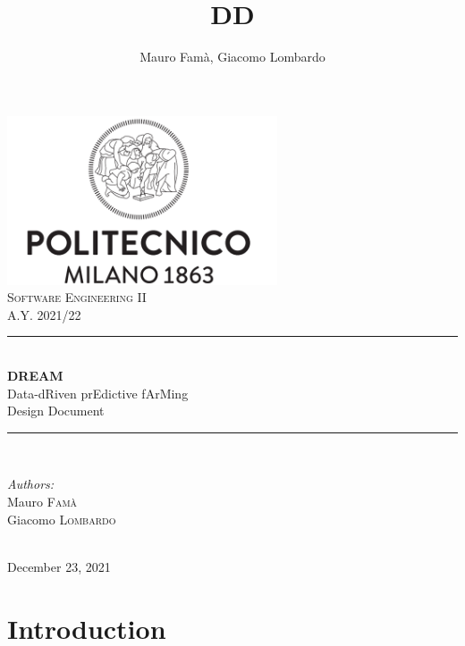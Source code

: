 \documentclass[10pt]{article}
\title{DD}
\author{Mauro Famà, Giacomo Lombardo}
\begin{document}
\thispagestyle{empty}
\begin{titlepage}
    \newcommand{\HRule}{\rule{\linewidth}{0.5mm}}
    \center
    \includegraphics[width=8cm]{polimi.png}\\[1cm]

    \textsc{\Large Software Engineering II}\\[0.5cm]
    \textsc{\large A.Y. 2021/22}\\[0.5cm]

    \HRule \\[0.4cm]
        { \Huge \bfseries DREAM}\\[0.2cm]
        { \large Data-dRiven prEdictive fArMing}\\[0.4cm]
        { \LARGE Design Document}
    \HRule \\[1.5cm]

    \begin{minipage}{0.4\textwidth}
        \begin{flushleft} \large
        \emph{Authors:}\\
        Mauro \textsc{Famà}\\
        Giacomo \textsc{Lombardo}\\
        \end{flushleft}
    \end{minipage}\\[2cm]

    {\large December 23, 2021}\\[2cm]
    
    \vfill
\end{titlepage}
\newpage
\tableofcontents %
\newpage
\section{Introduction}
\end{document}
